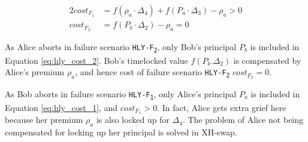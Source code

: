 \begin{alignat}{2}
    cost_{F_1} &= f(\rho_a\cdot\Delta_4) + f(P_a\cdot\Delta_3) - \rho_a > 0 \label{eq:hly_cost_1} \\
    cost_{F_2} &= f(P_b\cdot\Delta_2) - \rho_a = 0 \label{eq:hly_cost_2}
\end{alignat}

As Alice aborts in failure scenario \texttt{HLY-F\textsubscript{2}}, only Bob's principal $P_b$ is included in Equation \ref{eq:hly_cost_2}. Bob's timelocked value $f(P_b.\Delta_2)$ is compensated by Alice's premium $\rho_a$, and hence cost of failure scenario \texttt{HLY-F\textsubscript{2}} $cost_{F_2} = 0$.

As Bob aborts in failure scenario \texttt{HLY-F\textsubscript{1}}, only Alice's principal $P_a$ is included in Equation \ref{eq:hly_cost_1}, and $cost_{F_1} > 0$. In fact, Alice gets extra grief here because her premium $\rho_a$ is also locked up for $\Delta_4$. The problem of Alice not being compensated for locking up her principal is solved in XH-swap.

